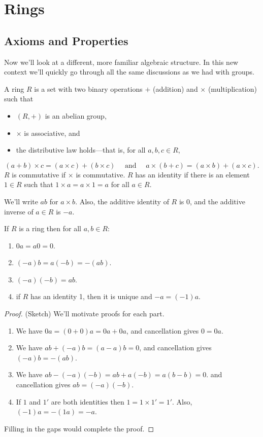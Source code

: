 \documentclass[../m171main.tex]{subfiles}
\begin{document}
\chapter{Rings}
\section{Axioms and Properties}
Now we'll look at a different, more familiar algebraic structure.
In this new context we'll quickly go through all the same discussions as we had with groups.

\begin{definition}[Ring]
    A ring $R$ is a set with two binary operations $+$ (addition) and $\times$ (multiplication) such that
    \begin{itemize}[topsep=0pt]
        \item $(R, +)$ is an abelian group,
        \item $\times$ is associative, and
        \item the distributive law holds---that is, for all $a,b,c \in R$,
    \end{itemize}
    \[ (a + b) \times c = (a \times c) + (b \times c) \quad\text{ and }\quad a \times (b + c) = (a \times b) + (a \times c). \]
    $R$ is commutative if $\times$ is commutative.
    $R$ has an identity if there is an element $1 \in R$ such that $1 \times a = a \times 1 = a$ for all $a \in R$.
\end{definition}

We'll write $ab$ for $a \times b$.
Also, the additive identity of $R$ is 0, and the additive inverse of $a \in R$ is $-a$.

\begin{theorem}[] %
    If $R$ is a ring then for all $a,b \in R$:
    \begin{enumerate}[label=(\alph*),topsep=0pt]
        \item $0a = a0 = 0$.
        \item $(-a)b = a(-b) = -(ab)$.
        \item $(-a)(-b) = ab$. %
        \item if $R$ has an identity 1, then it is unique and $-a = (-1)a$.
    \end{enumerate}
\end{theorem}
\begin{proof}
    (Sketch) We'll motivate proofs for each part.
    \begin{enumerate}[label=(\alph*),topsep=0pt]
        \item We have $0a = (0+0)a = 0a + 0a$, and cancellation gives $0 = 0a$.
        \item We have $ab + (-a)b = (a-a)b = 0$, and cancellation gives $(-a)b = -(ab)$.
        \item We have $ab - (-a)(-b) = ab + a(-b) = a(b-b) = 0$. and cancellation gives $ab = (-a)(-b)$.
        \item If $1$ and $1'$ are both identities then $1 = 1 \times 1' = 1'$.
        Also, $(-1)a = -(1a) = -a$.
    \end{enumerate}
    Filling in the gaps would complete the proof.
\end{proof} %
\end{document}
